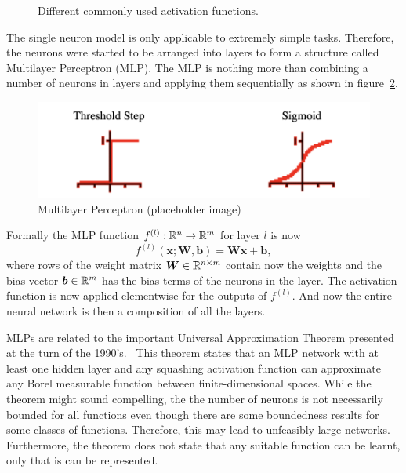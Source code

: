 \begin{figure}\label{fig:activations}
    \caption{Different commonly used activation functions.}
\end{figure}

The single neuron model is only applicable to extremely simple tasks.
Therefore, the neurons were started to be arranged into layers to form a structure called Multilayer Perceptron (MLP).
The MLP is nothing more than combining a number of neurons in layers and applying them sequentially as shown in figure~\ref{fig:mlp}.
\begin{figure}\label{fig:mlp}
    \includegraphics{background/fig/activations.png}
    \caption{Multilayer Perceptron (placeholder image)}
\end{figure}

Formally the MLP function $f^{(l)} : \mathbb{R}^n \rightarrow \mathbb{R}^m$ for layer $l$ is now
\begin{equation}
    f^{(l)}(\bm{x}; \bm{W}, \bm{b}) = \bm{W} \bm{x} + \bm{b},
\end{equation}
where rows of the weight matrix $\bm{W} \in \mathbb{R}^{n \times m}$ contain now the weights and the bias vector $\bm{b} \in \mathbb{R}^{m}$ has the bias terms of the neurons in the layer.
The activation function is now applied elementwise for the outputs of $f^{(l)}$.
And now the entire neural network is then a composition of all the layers.

MLPs are related to the important Universal Approximation Theorem presented at the turn of the 1990's.~\cite{cybenko,horniketal,hornik}
This theorem states that an MLP network with at least one hidden layer and any squashing activation function can approximate any Borel measurable function between finite-dimensional spaces.
While the theorem might sound compelling, the the number of neurons is not necessarily bounded for all functions even though there are some boundedness results for some classes of functions.
Therefore, this may lead to unfeasibly large networks.
Furthermore, the theorem does not state that any suitable function can be learnt, only that is can be represented.

